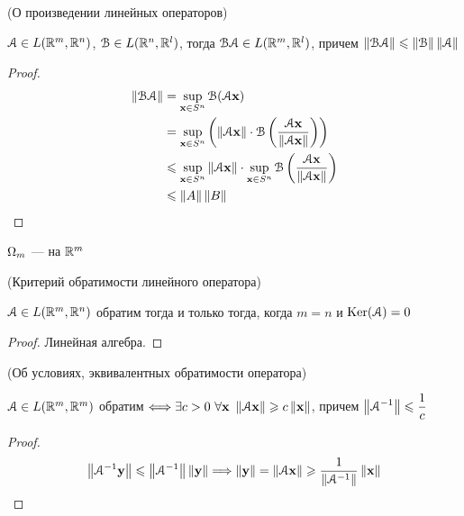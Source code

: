 \begin{theorem}(О произведении линейных операторов)

    $\cA \in L(\Rm, \Rn)$, $\cB \in L(\Rn, \mathbb{R}^l)$, тогда
    $\cB \cA \in L(\Rm, \mathbb{R}^l)$, причем $\norm{\cB \cA} \leqslant
    \norm{\cB} \norm{\cA}$
\end{theorem}
\begin{proof}
    \begin{align*}
        \norm{\cB \cA} &= \sup_{\x \in S^n}{\cB(\cA \x)} \\
        &= \sup_{\x \in S^n}{\left(\norm{\cA \x} \cdot \cB\left(\frac{\cA
        \x}{\norm{\cA \x}}\right)\right)} \\
        &\leqslant \sup_{\x \in S^n}{\norm{\cA \x}} \cdot
        \sup_{\x \in S^n}{\cB\left(\frac{\cA \x}{\norm{\cA \x}}\right)} \\
        &\leqslant \norm{A} \norm{B}
    \end{align*}
\end{proof}

\begin{definition}
    $\O_m$ ---  на $\Rm$
\end{definition}

\begin{lemma}(Критерий обратимости линейного оператора)

    $\cA \in L(\Rm, \Rn)$ обратим тогда и только тогда, когда $m = n$ и
    $\Ker(\cA) = 0$
\end{lemma}
\begin{proof}
    Линейная алгебра.
\end{proof}

\begin{lemma}(Об условиях, эквивалентных обратимости оператора)

    $\cA \in L(\Rm, \Rm)$ обратим $\Llra \exists c>0~ \forall \x~ \norm{\cA \x}
    \geqslant c\norm{\x}$, причем $\displaystyle \norm{\cA^{-1}} \leqslant
    \frac{1}{c}$
\end{lemma}
\begin{proof}
\[
    \norm{\cA^{-1} \y} \leqslant \norm{\cA^{-1}} \norm{\y} \Lra \norm{\y} =
    \norm{\cA \x} \geqslant \frac{1}{\norm{\cA^{-1}}} \norm{\x}
\]
\end{proof}

